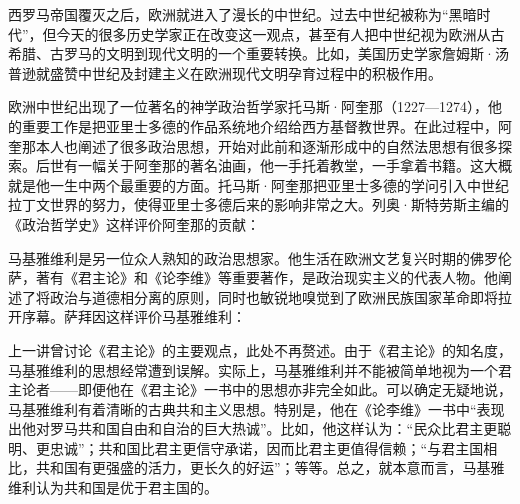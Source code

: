 
西罗马帝国覆灭之后，欧洲就进入了漫长的中世纪。过去中世纪被称为“黑暗时代”，但今天的很多历史学家正在改变这一观点，甚至有人把中世纪视为欧洲从古希腊、古罗马的文明到现代文明的一个重要转换。比如，美国历史学家詹姆斯·汤普逊就盛赞中世纪及封建主义在欧洲现代文明孕育过程中的积极作用。

欧洲中世纪出现了一位著名的神学政治哲学家托马斯·阿奎那（1227—1274），他的重要工作是把亚里士多德的作品系统地介绍给西方基督教世界。在此过程中，阿奎那本人也阐述了很多政治思想，开始对此前和逐渐形成中的自然法思想有很多探索。后世有一幅关于阿奎那的著名油画，他一手托着教堂，一手拿着书籍。这大概就是他一生中两个最重要的方面。托马斯·阿奎那把亚里士多德的学问引入中世纪拉丁文世界的努力，使得亚里士多德后来的影响非常之大。列奥·斯特劳斯主编的《政治哲学史》这样评价阿奎那的贡献：


马基雅维利是另一位众人熟知的政治思想家。他生活在欧洲文艺复兴时期的佛罗伦萨，著有《君主论》和《论李维》等重要著作，是政治现实主义的代表人物。他阐述了将政治与道德相分离的原则，同时也敏锐地嗅觉到了欧洲民族国家革命即将拉开序幕。萨拜因这样评价马基雅维利：


上一讲曾讨论《君主论》的主要观点，此处不再赘述。由于《君主论》的知名度，马基雅维利的思想经常遭到误解。实际上，马基雅维利并不能被简单地视为一个君主论者——即便他在《君主论》一书中的思想亦非完全如此。可以确定无疑地说，马基雅维利有着清晰的古典共和主义思想。特别是，他在《论李维》一书中“表现出他对罗马共和国自由和自治的巨大热诚”。比如，他这样认为：“民众比君主更聪明、更忠诚”；共和国比君主更信守承诺，因而比君主更值得信赖；“与君主国相比，共和国有更强盛的活力，更长久的好运”；等等。总之，就本意而言，马基雅维利认为共和国是优于君主国的。

